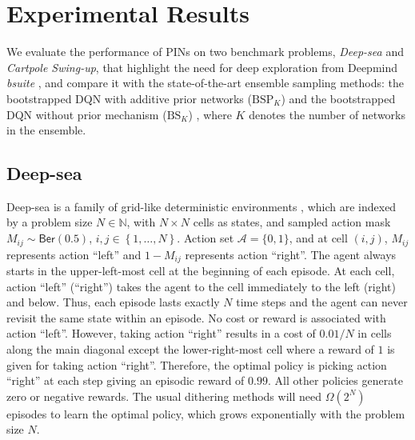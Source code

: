\documentclass[letterpaper]{article} %
\newcommand{\Sp}[1]{\left(#1\right)}
\newcommand{\Bp}[1]{\left\{#1\right\}}
\theoremstyle{definition}
\begin{document}
\section{Experimental Results}

We evaluate the performance of PINs on two benchmark problems, \textit{Deep-sea} and \textit{Cartpole Swing-up}, that highlight the need for deep exploration from Deepmind \textit{bsuite} \cite{osband2019bsuite}, and compare it with the state-of-the-art ensemble sampling methods: the bootstrapped DQN with additive prior networks ($\mathrm{BSP}_K$) \cite{osband2018randomized} and the bootstrapped DQN without prior mechanism ($\mathrm{BS}_{K}$) \cite{osband2016deep}, where $K$ denotes the number of networks in the ensemble.

\subsection{Deep-sea}
Deep-sea is a family of grid-like deterministic environments \cite{osband2017deep}, which are indexed by a problem size $N \in \mathbb{N}$, with $N \times N$ cells as states, and sampled action mask $M_{ij}\sim\mathsf{Ber}(0.5)$, $i, j\in\Bp{1, \dots, N}$. Action set $\mathcal{A} = \{0, 1\}$, and at cell $\Sp{i, j}$, $M_{ij}$ represents action ``left'' and $1-M_{ij}$ represents action ``right''. The agent always starts in the upper-left-most cell at the beginning of each episode. At each cell, action ``left'' (``right'') takes the agent to the cell immediately to the left (right) and below. Thus, each episode lasts exactly $N$ time steps and the agent can never revisit the same state within an episode. No cost or reward is associated with action ``left''. However, taking action ``right'' results in a cost of $0.01/N$ in cells along the main diagonal except the lower-right-most cell where a reward of $1$ is given for taking action ``right''. Therefore, the optimal policy is picking action ``right'' at each step giving an episodic reward of $0.99$. All other policies generate zero or negative rewards. The usual dithering methods will need $\Omega\Sp{2^N}$ episodes to learn the optimal policy, which grows exponentially with the problem size $N$.
\end{document}
